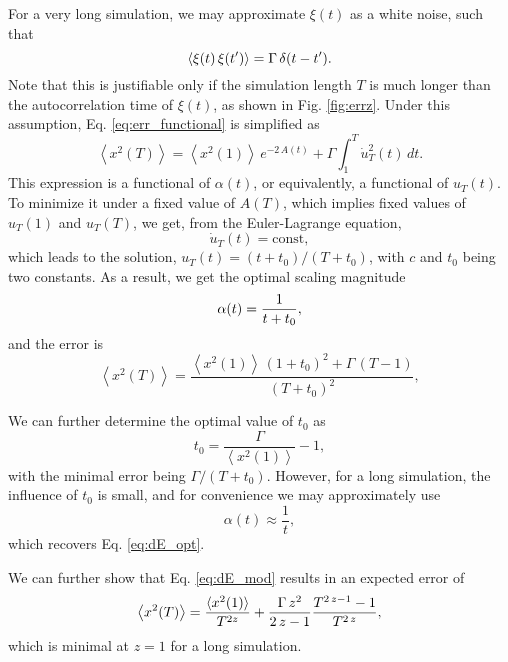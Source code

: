 \documentclass[reprint]{revtex4-1}
\begin{document}
For a very long simulation,
we may approximate $\xi(t)$ as a white noise,
such that
\begin{equation}
  \left\langle \xi(t) \, \xi(t') \right\rangle
  = \Gamma \, \delta(t - t').
  \notag
\end{equation}
%
Note that this is justifiable only
if the simulation length $T$ is much longer than
the autocorrelation time of $\xi(t)$,
as shown in Fig. \ref{fig:errz}.
%
Under this assumption,
Eq. \eqref{eq:err_functional} is simplified as
%
\begin{equation}
  \left\langle
    x^2(T)
  \right\rangle
  =
  \left\langle
    x^2(1)
  \right\rangle
  \, e^{ -2 \, A(t) }
  +
  \Gamma
  \int_1^T
    \dot u_T^2(t) \, dt
  .
  \label{eq:err_functional_wn}
\end{equation}
%
This expression is a functional of $\alpha(t)$,
or equivalently, a functional of $u_T(t)$.
%
To minimize it under a fixed value of $A(T)$,
which implies fixed values of $u_T(1)$ and $u_T(T)$,
we get, from the Euler-Lagrange equation,
$$
\dot u_T(t) = \mathrm{const},
$$
which leads to the solution,
$u_T(t) = (t + t_0) / (T + t_0)$,
with $c$ and $t_0$ being two constants.
%
As a result, we get the optimal scaling magnitude
%
\begin{equation}
  \alpha(t) = \frac{ 1 } { t + t_0 }
  ,
  \notag
\end{equation}
%
and the error is
%
$$%
  \left\langle
    x^2(T)
  \right\rangle
  =
  \frac{
    \left\langle x^2(1) \right\rangle
    \, (1 + t_0)^2
    + \Gamma \, (T - 1)
  }
  {
    (T + t_0)^2
  }
  ,
$$%

We can further determine the optimal value of $t_0$ as
$$
t_0 = \frac{ \Gamma } { \left\langle x^2(1) \right\rangle } - 1,
$$
%
with the minimal error being $\Gamma / (T + t_0)$.
%
However, for a long simulation, the influence of $t_0$
is small, and for convenience we may approximately use
$$
\alpha(t) \approx \frac 1 t,
$$
which recovers Eq. \eqref{eq:dE_opt}.

We can further show that Eq. \eqref{eq:dE_mod}
results in an expected error of
\begin{equation}
  \left\langle
  x^2(T)
  \right\rangle
  =
  \frac{ \langle x^2(1) \rangle } { T^{2z} }
  +
  \frac{ \Gamma \, z^2 } { 2 \, z - 1 }
  \frac{
    T^{2 \, z - 1} - 1
  }
  {
    T^{2 \, z}
  }
  ,
  \notag
\end{equation}
which is minimal at $z = 1$ for a long simulation.
\end{document}
